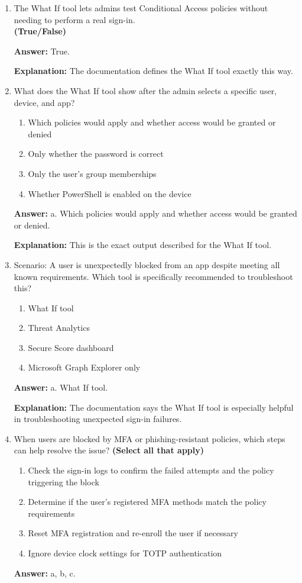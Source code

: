 \documentclass[10pt]{article}
\begin{document}
\begin{enumerate}[leftmargin=*]
\textbf{Explanation:} These are the exact common failure reasons listed in the documentation.

\item The What If tool lets admins test Conditional Access policies without\\
needing to perform a real sign-in.\\
\textbf{(True/False)}

\textbf{Answer:} True.

\textbf{Explanation:} The documentation defines the What If tool exactly this way.

\item What does the What If tool show after the admin selects a specific user, device, and app?
\begin{enumerate}[label=\alph*., leftmargin=1.5em]
\item Which policies would apply and whether access would be granted or denied
\item Only whether the password is correct
\item Only the user’s group memberships
\item Whether PowerShell is enabled on the device
\end{enumerate}
\textbf{Answer:} a. Which policies would apply and whether access would be granted or denied.

\textbf{Explanation:} This is the exact output described for the What If tool.

\item Scenario: A user is unexpectedly blocked from an app despite meeting all known requirements. Which tool is specifically recommended to troubleshoot this?
\begin{enumerate}[label=\alph*., leftmargin=1.5em]
\item What If tool
\item Threat Analytics
\item Secure Score dashboard
\item Microsoft Graph Explorer only
\end{enumerate}
\textbf{Answer:} a. What If tool.

\textbf{Explanation:} The documentation says the What If tool is especially helpful in troubleshooting unexpected sign-in failures.

\item When users are blocked by MFA or phishing-resistant policies, which steps can help resolve the issue? \textbf{(Select all that apply)}
\begin{enumerate}[label=\alph*., leftmargin=1.5em]
\item Check the sign-in logs to confirm the failed attempts and the policy triggering the block
\item Determine if the user’s registered MFA methods match the policy requirements
\item Reset MFA registration and re-enroll the user if necessary
\item Ignore device clock settings for TOTP authentication
\end{enumerate}
\textbf{Answer:} a, b, c.


\end{enumerate}
\end{document}
